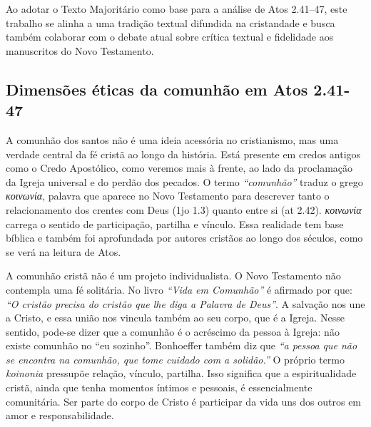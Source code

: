 Ao adotar o Texto Majoritário como base para a análise de Atos 2.41–47, este trabalho se alinha a uma tradição textual difundida na cristandade e busca também colaborar com o debate atual sobre crítica textual e fidelidade aos manuscritos do Novo Testamento.

\subsection{Dimensões éticas da comunhão em Atos 2.41-47}

A comunhão dos santos não é uma ideia acessória no cristianismo, mas uma verdade central da fé cristã ao longo da história. Está presente em credos antigos como o Credo Apostólico, como veremos mais à frente, ao lado da proclamação da Igreja universal e do perdão dos pecados. O termo \textit{``comunhão''} traduz o grego \textit{\foreignlanguage{greek}{κοινωνία}}, palavra que aparece no Novo Testamento para descrever tanto o relacionamento dos crentes com Deus (\gls{1jo} 1.3) quanto entre si (\gls{at} 2.42). \textit{\foreignlanguage{greek}{κοινωνία}} carrega o sentido de participação, partilha e vínculo. Essa realidade tem base bíblica e também foi aprofundada por autores cristãos ao longo dos séculos, como se verá na leitura de Atos.

A comunhão cristã não é um projeto individualista. O Novo Testamento não contempla uma fé solitária. No livro \textit{``Vida em Comunhão''} é afirmado por  que: \textit{``O cristão precisa do cristão que lhe diga a Palavra de Deus''}. A salvação nos une a Cristo, e essa união nos vincula também ao seu corpo, que é a Igreja. Nesse sentido, pode-se dizer que a comunhão é o acréscimo da pessoa à Igreja: não existe comunhão no ``eu sozinho''. Bonhoeffer também diz que \textit{``a pessoa que não se encontra na comunhão, que tome cuidado com a solidão.''} \cite[p.~59]{bonhoeffer1997} O próprio termo \textit{koinonia} pressupõe relação, vínculo, partilha. Isso significa que a espiritualidade cristã, ainda que tenha momentos íntimos e pessoais, é essencialmente comunitária. Ser parte do corpo de Cristo é participar da vida uns dos outros em amor e responsabilidade.

